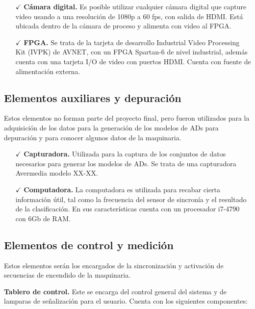 \documentclass[twoside,spanish,ESP,MSc]{plantillaLabUPV}
\theoremstyle{definition}
\begin{document}
\begin{itemize}
	\item[$\checkmark$] \textbf{Cámara digital.} Es posible utilizar cualquier cámara digital que capture video usando a una resolución de 1080p a 60 fps, con salida de HDMI. Está ubicada dentro de la cámara de proceso y alimenta con video al FPGA.
	\item[$\checkmark$] \textbf{FPGA.} Se trata de la tarjeta de desarrollo Industrial Video Processing Kit (IVPK) de AVNET, con un FPGA Spartan-6 de nivel industrial, además cuenta con una tarjeta I/O de video con puertos HDMI. Cuenta con fuente de alimentación externa.

\end{itemize}




\subsection{Elementos auxiliares y depuración}
Estos elementos no forman parte del proyecto final, pero fueron utilizados para la adquisición de los datos para la generación de los modelos de ADs para depuración y para conocer algunos datos de la maquinaria.

\begin{itemize}
	\item[$\checkmark$] \textbf{Capturadora.} Utilizada para la captura de los conjuntos de datos necesarios para generar los modelos de ADs. Se trata de una capturadora Avermedia modelo XX-XX.
	
	\item[$\checkmark$] \textbf{Computadora.} La computadora es utilizada para recabar cierta información útil, tal como la frecuencia del sensor de sincronía y el resultado de la clasificación. En sus características cuenta con un procesador i7-4790 con 6Gb de RAM.
\end{itemize}



\subsection{Elementos de control y medición}
Estos elementos serán los encargados de la sincronización y activación de secuencias de encendido de la maquinaria.


\checkmark\textbf{Tablero de control.} Este se encarga del control general del sistema y de lamparas de señalización para el usuario. Cuenta con los siguientes componentes:
\end{document}
